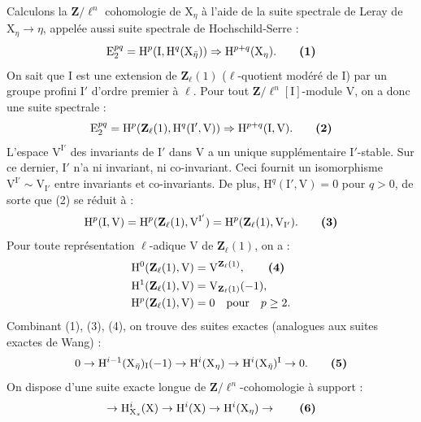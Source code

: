 \documentclass[11pt,leqno]{article}
\begin{document}
Calculons la \(\mathbf Z/\ell^n\) cohomologie de \(\mathrm X_\eta\) à l’aide de la suite spectrale de Leray de \(\mathrm X_\eta\to\eta\), appelée aussi suite spectrale de Hochschild-Serre :
\[
\mathrm E_2^{pq}=\mathrm H^p(\mathrm I,\mathrm H^q(\mathrm X_{\bar\eta}))
\Rightarrow\mathrm H^{p+q}(\mathrm X_\eta).
\tag*{\textbf{(1)}}
\]
On sait que \(\mathrm I\) est une extension de \(\mathbf Z_\ell(1)\) (\(\ell\)-quotient modéré de \(\mathrm I\)) par un groupe profini \(\mathrm I'\) d’ordre premier à \(\ell\). Pour tout \(\mathbf Z/\ell^n[\mathrm I]\)-module \(\mathrm V\), on a donc une suite spectrale :
\[
\mathrm E_2^{pq}=\mathrm H^p(\mathbf Z_\ell(1),\mathrm H^q(\mathrm I',\mathrm V))
\Rightarrow\mathrm H^{p+q}(\mathrm I,\mathrm V).
\tag*{\textbf{(2)}}
\]
L’espace \(\mathrm V^{\mathrm I'}\) des invariants de \(\mathrm I'\) dans \(\mathrm V\) a un unique supplémentaire \(\mathrm I'\)-stable. Sur ce dernier, \(\mathrm I'\) n’a ni invariant, ni co-invariant. Ceci fournit un isomorphisme \(\mathrm V^{\mathrm I'}\sim\mathrm V_{\mathrm I'}\) entre invariants et co-invariants. De plus, \(\mathrm H^q(\mathrm I',\mathrm V)=0\) pour \(q>0\), de sorte que (2) se réduit à :
\[
\mathrm H^p(\mathrm I,\mathrm V)
=\mathrm H^p(\mathbf Z_\ell(1),\mathrm V^{\mathrm I'})
=\mathrm H^p(\mathbf Z_\ell(1),\mathrm V_{\mathrm I'}).
\tag*{\textbf{(3)}}
\]
Pour toute représentation \(\ell\)-adique \(\mathrm V\) de \(\mathbf Z_\ell(1)\), on a :
\begin{align*}
\mathrm H^0(\mathbf Z_\ell(1),\mathrm V)&=\mathrm V^{\mathbf Z_\ell(1)},
\tag*{\textbf{(4)}}\\
\mathrm H^1(\mathbf Z_\ell(1),\mathrm V)&=\mathrm V_{\mathbf Z_\ell(1)}(-1),\\
\mathrm H^p(\mathbf Z_\ell(1),\mathrm V)&=0\quad\text{pour}\quad p\geq2.
\end{align*}
Combinant (1), (3), (4), on trouve des suites exactes (analogues aux suites exactes de Wang) :
\[
0\to\mathrm H^{i-1}(\mathrm X_{\bar\eta})_{\mathrm I}(-1)
\to\mathrm H^i(\mathrm X_\eta)
\to\mathrm H^i(\mathrm X_{\bar\eta})^{\mathrm I}\to0.
\tag*{\textbf{(5)}}
\]
On dispose d’une suite exacte longue de \(\mathbf Z/\ell^n\)-cohomologie à support :
\[
\to\mathrm H^i_{\mathrm X_s}(\mathrm X)
\to\mathrm H^i(\mathrm X)
\to\mathrm H^i(\mathrm X_\eta)\to
\tag*{\textbf{(6)}}
\]
\end{document}
